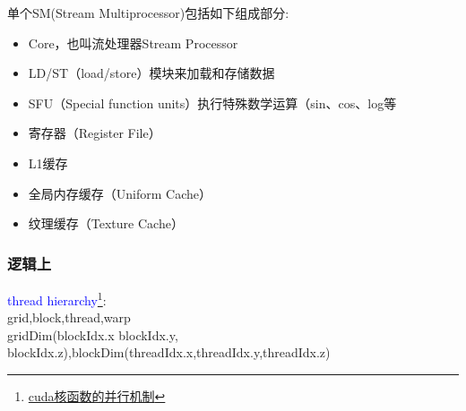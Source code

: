 单个SM(Stream Multiprocessor)包括如下组成部分:
\begin{itemize}
	\item Core，也叫流处理器Stream Processor
	\item LD/ST（load/store）模块来加载和存储数据
	\item SFU（Special function units）执行特殊数学运算（sin、cos、log等
	\item 寄存器（Register File）
	\item L1缓存
	\item 全局内存缓存（Uniform Cache）
	\item 纹理缓存（Texture Cache）
\end{itemize}

\subsubsection{逻辑上}
\noindent
\textcolor{blue}{thread hierarchy}\footnote{\href{https://blog.csdn.net/yangjinyi1314/article/details/124905292}{cuda核函数的并行机制}}:\\
grid,block,thread,warp\\
gridDim(blockIdx.x
blockIdx.y,
blockIdx.z),blockDim(threadIdx.x,threadIdx.y,threadIdx.z)\\

